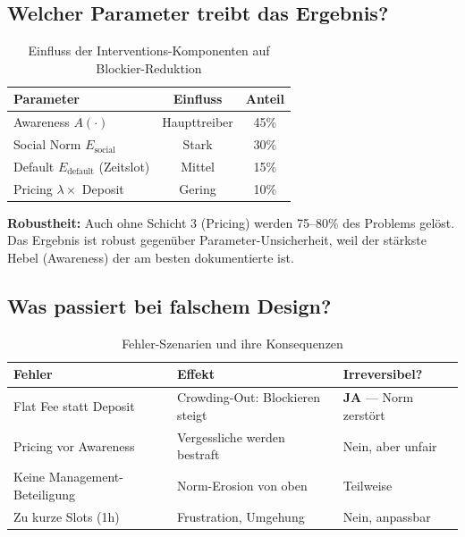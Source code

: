 \documentclass[11pt,a4paper]{article}
\begin{document}
\subsection{Welcher Parameter treibt das Ergebnis?}

\begin{table}[H]
\centering
{}
\begin{tabular}{lcc}
\toprule
\textbf{\color{fadarkblue}Parameter} & \textbf{\color{fadarkblue}Einfluss} & \textbf{\color{fadarkblue}Anteil} \\
\midrule
Awareness $A(\cdot)$ & Haupttreiber & 45\% \\
Social Norm $E_{\text{social}}$ & Stark & 30\% \\
Default $E_{\text{default}}$ (Zeitslot) & Mittel & 15\% \\
Pricing $\lambda \times$ Deposit & Gering & 10\% \\
\bottomrule
\end{tabular}
\caption{Einfluss der Interventions-Komponenten auf Blockier-Reduktion}
\end{table}

\textbf{Robustheit:} Auch ohne Schicht 3 (Pricing) werden 75--80\% des Problems gel\"ost. Das Ergebnis ist robust gegen\"uber Parameter-Unsicherheit, weil der st\"arkste Hebel (Awareness) der am besten dokumentierte ist.

\subsection{Was passiert bei falschem Design?}

\begin{table}[H]
\centering
{}
\begin{tabular}{p{4cm}p{3cm}p{4cm}}
\toprule
\textbf{\color{fared}Fehler} & \textbf{\color{fared}Effekt} & \textbf{\color{fared}Irreversibel?} \\
\midrule
Flat Fee statt Deposit & Crowding-Out: Blockieren steigt & \textbf{JA} --- Norm zerst\"ort \\
Pricing vor Awareness & Vergessliche werden bestraft & Nein, aber unfair \\
Keine Management-Beteiligung & Norm-Erosion von oben & Teilweise \\
Zu kurze Slots (1h) & Frustration, Umgehung & Nein, anpassbar \\
\bottomrule
\end{tabular}
\caption{Fehler-Szenarien und ihre Konsequenzen}
\end{table}
\end{document}
